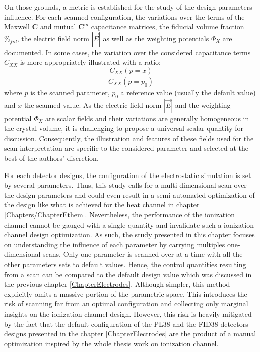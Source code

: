 On those grounds, a metric is established for the study of the design parameters influence. For each scanned configuration, the variations over the terms of the Maxwell $\bm{C}$ and mutual $\bm{C}^m$ capacitance matrices, the fiducial volume fraction $\%_{fid}$, the electric field norm $|\vec{E}|$ as well as the weighting potentials $\Phi_X$ are documented. In some cases, the variation over the considered capacitance terms $C_{XX}$ is more appropriately illustrated with a ratio:
\begin{equation}
\frac{C_{XX}\left(p=x\right)}{C_{XX}\left(p=p_0\right)}
\end{equation}
where $p$ is the scanned parameter, $p_0$ a reference value (usually the default value) and $x$ the scanned value. As the electric field norm $|\vec{E}|$ and the weighting potential $\Phi_X$ are scalar fields and their variations are generally homogeneous in the crystal volume, it is challenging to propose a universal scalar quantity for discussion. Consequently, the illustration and features of these fields used for the scan interpretation are specific to the considered parameter and selected at the best of the authors' discretion.

For each detector designs, the configuration of the electrostatic simulation is set by several parameters. Thus, this study calls for a multi-dimensional scan over the design parameters and could even result in a semi-automated optimization of the design like what is achieved for the heat channel in chapter \ref{Chapters/ChapterEthem}. Nevertheless, the performance of the ionization channel cannot be gauged with a single quantity and invalidate such a ionization channel design optimization. As such, the study presented in this chapter focuses on understanding the influence of each parameter by carrying multiples one-dimensional scans. Only one parameter is scanned over at a time with all the other parameters sets to default values. Hence, the control quantities resulting from a scan can be compared to the default design value which was discussed in the previous chapter \ref{ChapterElectrodes}.
Although simpler, this method explicitly omits a massive portion of the parametric space. This introduces the risk of scanning far from an optimal configuration and collecting only marginal insights on the ionization channel design. However, this risk is heavily mitigated by the fact that the default configuration of the PL38 and the FID38 detectors designs presented in the chapter \ref{ChapterElectrodes} are the product of a manual optimization inspired by the whole thesis work on ionization channel.


